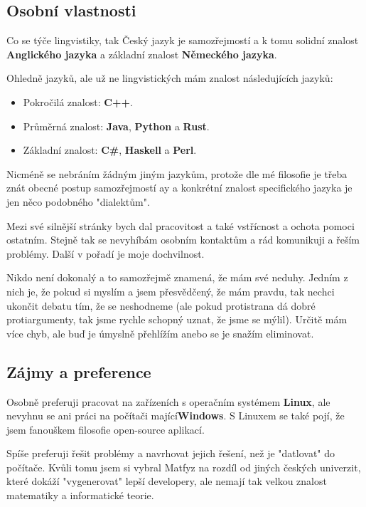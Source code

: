 \documentclass{article}
\begin{document}
\subsection*{Osobní vlastnosti}

Co se týče lingvistiky, tak Český jazyk je samozřejmostí a k tomu solidní znalost \textbf{Anglického jazyka }a základní znalost \textbf{Německého jazyka}.

Ohledně jazyků, ale už ne lingvistických mám znalost následujících jazyků:

\begin{itemize}
	\item Pokročilá znalost: \textbf{C++}.
	\item Průměrná znalost: \textbf{Java}, \textbf{Python} a \textbf{Rust}.
	\item Základní znalost: \textbf{C\#}, \textbf{Haskell} a \textbf{Perl}.
\end{itemize}

Nicméně se nebráním žádným jiným jazykům, protože dle mé filosofie je třeba znát obecné postup samozřejmostí ay a konkrétní znalost specifického jazyka je jen něco podobného "dialektům".

Mezi své silnější stránky bych dal pracovitost a také vstřícnost a ochota pomoci ostatním. Stejně tak se nevyhíbám osobním kontaktům a rád komunikuji a řeším problémy. Další v pořadí je moje dochvilnost.

Nikdo není dokonalý a to samozřejmě znamená, že mám své neduhy. Jedním z nich je, že pokud si myslím a jsem přesvědčený, že mám pravdu, tak nechci ukončit debatu tím, že se neshodneme (ale pokud protistrana dá dobré protiargumenty, tak jsme rychle schopný uznat, že jsme se mýlil). Určitě mám více chyb, ale buď je úmyslně přehlížím anebo se je snažím eliminovat.

\subsection*{Zájmy a preference}

Osobně preferuji pracovat na zařízeních s operačním systémem \textbf{Linux}, ale nevyhnu se ani práci na počítači mající\textbf{Windows}. S Linuxem se také pojí, že jsem fanouškem filosofie open-source aplikací.

Spíše preferuji řešit problémy a navrhovat jejich řešení, než je "datlovat" do počítače. Kvůli tomu jsem si vybral Matfyz na rozdíl od jiných českých univerzit, které dokáží "vygenerovat" lepší developery, ale nemají tak velkou znalost matematiky a informatické teorie.
\end{document}
